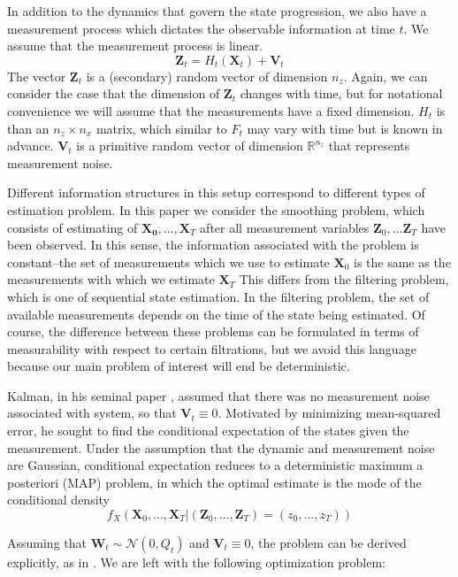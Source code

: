 \documentclass[12pt]{article}
\renewcommand{\vec}[1]{\mathbf{#1}}
\theoremstyle{remark}
\theoremstyle{remark}
\begin{document}
In addition to the dynamics that govern the state progression, we also
have a measurement process which dictates the observable information
at time $t$. We assume that the measurement process is linear.
\begin{equation} \label{estmeasure}
\vec{Z}_{t} = H_{t}(\vec{X}_{t}) + \vec{V}_{t}
\end{equation}
The vector $\vec{Z}_{t}$ is a (secondary) random vector of dimension $n_{z}$. 
Again, we can consider the case that the dimension of $\vec{Z}_{t}$ changes with
time, but for notational convenience we will assume that the
measurements have a fixed dimension. $H_{t}$ is than an $n_{z} \times
n_{x}$ matrix, which similar to $F_{t}$ may vary with time but is
known in advance. $\vec{V}_{t}$ is a primitive random vector of
dimension $\mathbb{R}^{n_{z}}$ that represents measurement noise. 

Different information structures in this setup correspond to different
types of estimation problem. In this paper we consider the smoothing
problem, which consists of estimating of
$\vec{X_{0}},...,\vec{X}_{T}$
after all measurement variables $\vec{Z}_{0},...\vec{Z}_{T}$ have been
observed. In this sense, the information associated with the problem
is constant--the set of measurements which we use to
estimate $\vec{X}_{0}$ is the same as the measurements with which we
estimate $\vec{X}_{T}$ This differs from the filtering problem,
which is one of sequential state estimation. In the filtering problem,
the set of available measurements depends on the time of the state
being estimated. Of course, the difference between these problems 
can be formulated in terms of measurability with respect to certain
filtrations, but we avoid this language because our main problem of
interest will end be deterministic.

Kalman, in his seminal paper \cite{Kalman},
assumed that there was no measurement noise associated with system, so
that $\vec{V}_{t} \equiv 0$. Motivated by minimizing mean-squared
error, he sought to find the conditional expectation of the states
given the measurement.
Under the assumption that the dynamic and measurement noise are
Gaussian, conditional expectation reduces to a deterministic maximum a posteriori
(MAP) problem, in which the optimal estimate is the mode of the
conditional density
$$f_{X}(\vec{X}_{0},...,\vec{X}_{T}|(\vec{Z}_{0},...,\vec{Z}_{T})=(z_{0},...,z_{T}))$$

Assuming that $\vec{W}_{t} \sim \mathcal{N}(0,Q_{t})$ and
$\vec{V}_{t} \equiv 0$, the problem can be derived explicitly, as in
\cite{Cox}. We are left with the following optimization problem:
\end{document}
